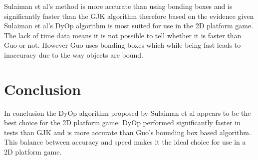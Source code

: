 \documentclass{scrartcl}
\begin{document}
Sulaiman et al's method is more accurate than using bonding boxes and is significantly faster than the GJK algorithm therefore based on the evidence given Sulaiman et al's DyOp algorithm is most suited for use in the 2D platform game. The lack of time data means it is not possible to tell whether it is faster than Guo or not. However Guo uses bonding boxes which while being fast leads to inaccuracy due to the way objects are bound.  
	
		
	
\section{Conclusion}
In conclusion the DyOp algorithm proposed by Sulaiman et al appears to be the best choice for the 2D platform game. DyOp performed significantly faster in tests than GJK and is more accurate than Guo's bounding box based algorithm. This balance between accuracy and speed makes it the ideal choice for use in a 2D platform game.  
	
	


	
\end{document}
